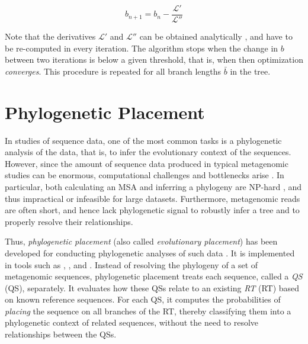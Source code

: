 \begin{equation}
    \label{ch:Foundations:sec:MLTreeInference:eq:BLO}
    b_{n+1} = b_n - \frac{ \mathcal{L}' }{ \mathcal{L}'' }
\end{equation}

Note that the derivatives $\mathcal{L}'$ and $\mathcal{L}''$ can be obtained analytically \cite{Yang2014},
and have to be re-computed in every iteration.
The algorithm stops when the change in $b$ between two iterations is below a given threshold,
that is, when then optimization \emph{converges}.
This procedure is repeated for all branch lengths $\bar{b}$ in the tree.


\section{Phylogenetic Placement}
\label{ch:Foundations:sec:PhylogeneticPlacement}

In studies of sequence data, one of the most common tasks is a phylogenetic analysis of the data,
that is, to infer the evolutionary context of the sequences.
However, since the amount of sequence data produced in typical metagenomic studies can be enormous,
computational challenges and bottlenecks arise \cite{Scholz2012}.
In particular, both calculating an MSA and inferring a phylogeny are NP-hard \cite{Just2001,Chor2005},
and thus impractical or infeasible for large datasets.
Furthermore, metagenomic reads are often short, and hence lack phylogenetic signal
to robustly infer a tree and to properly resolve their relationships.

Thus, \emph{phylogenetic placement}  (also called \emph{evolutionary placement})
has been developed for conducting phylogenetic analyses of such data \cite{VonMering2007,Monier2008}.
It is implemented in tools such as
 \cite{Matsen2010},  \cite{Berger2011}, and  \cite{Barbera2018}.
Instead of resolving the phylogeny of a set of metagenomic sequences,
phylogenetic placement treats each sequence, called a \emph{\acl{QS}} (\acs{QS}), separately.
It evaluates how these \acp{QS} relate to an existing \emph{\acl{RT}} (\acs{RT}) based on known reference sequences.
For each \ac{QS}, it computes the probabilities of \emph{placing} the sequence on all branches of the \ac{RT},
thereby classifying them into a phylogenetic context of related sequences,
without the need to resolve relationships between the \acp{QS}.

